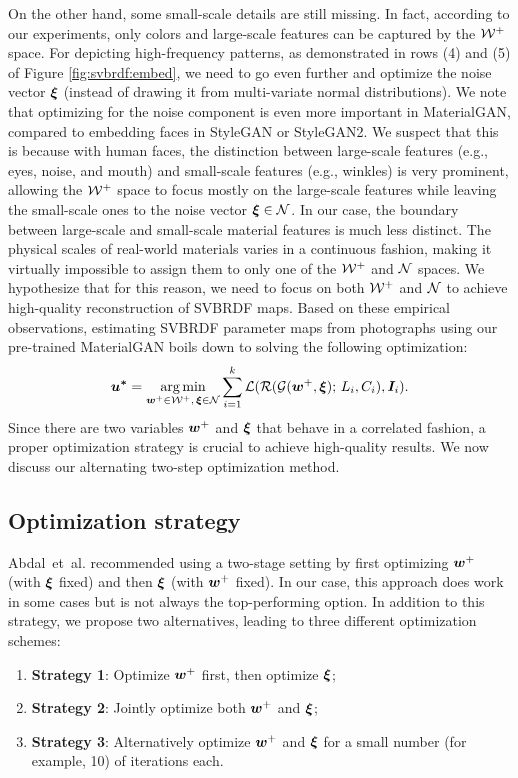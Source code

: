

On the other hand, some small-scale details are still missing.
In fact, according to our experiments, only colors and large-scale features can be captured by the $\mathcal{W}^+$ space.
For depicting high-frequency patterns, as demonstrated in rows (4) and (5) of Figure \ref{fig:svbrdf:embed}, we need to go even further and optimize the noise vector $\bm{\xi}$ (instead of drawing it from multi-variate normal distributions).
We note that optimizing for the noise component is even more important in MaterialGAN, compared to embedding faces in StyleGAN or StyleGAN2.
We suspect that this is because with human faces, the distinction between large-scale features (e.g., eyes, noise, and mouth) and small-scale features (e.g., winkles) is very prominent, allowing the $\mathcal{W}^+$ space to focus mostly on the large-scale features while leaving the small-scale ones to the noise vector $\bm{\xi} \in \mathcal{N}$.
In our case, the boundary between large-scale and small-scale material features is much less distinct.
The physical scales of real-world materials varies in a continuous fashion, making it virtually impossible to assign them to only one of the $\mathcal{W}^+$ and $\mathcal{N}$ spaces.
We hypothesize that for this reason, we need to focus on both $\mathcal{W}^+$ and $\mathcal{N}$ to achieve high-quality reconstruction of SVBRDF maps.
Based on these empirical observations, estimating SVBRDF parameter maps from photographs using our pre-trained MaterialGAN boils down to solving the following optimization:
\begin{equation}
	\bm{u^{*}} = \operatorname*{arg\,min}_{\bm{w}^+ \in \mathcal{W}^+,\, \bm{\xi} \in \mathcal{N}} \sum_{i=1}^k \mathcal{L}(\mathcal{R}(\mathcal{G}(\bm{w}^+, \bm{\xi}); \,L_i, C_i), \bm{I}_i).
\end{equation}
Since there are two variables $\bm{w}^+$ and $\bm{\xi}$ that behave in a correlated fashion, a proper optimization strategy is crucial to achieve high-quality results. We now discuss our alternating two-step optimization method.

\subsection{Optimization strategy}
\label{ssec:optim}

Abdal~et~al. \cite{Abdal19a,Abdal19b} recommended using a two-stage setting by first optimizing $\bm{w}^+$ (with $\bm{\xi}$ fixed) and then $\bm{\xi}$ (with $\bm{w}^+$ fixed).
In our case, this approach does work in some cases but is not always the top-performing option.
In addition to this strategy, we propose two alternatives, leading to three different optimization schemes:
\begin{enumerate}
	\item \textbf{Strategy 1}: Optimize $\bm{w}^+$ first, then optimize $\bm{\xi}$;
	\item \textbf{Strategy 2}: Jointly optimize both $\bm{w}^+$ and $\bm{\xi}$;
	\item \textbf{Strategy 3}: Alternatively optimize $\bm{w}^+$ and $\bm{\xi}$ for a small number (for example, 10) of iterations each.
\end{enumerate}

